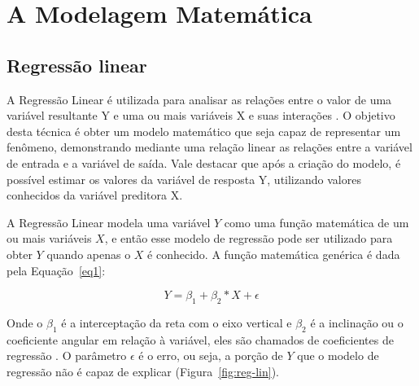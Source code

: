 \chapter{A Modelagem Matemática}
\label{chap:a_modelagem_matematica}


\section{Regressão linear}
\label{sec:a_modelagem_matematica_modelo_linear}

A Regressão Linear é utilizada para analisar as relações entre o valor de uma variável resultante Y e uma ou mais variáveis X e suas interações \cite{yang2020hyperparameter}. O objetivo desta técnica é obter um modelo matemático que seja capaz de representar um fenômeno, demonstrando mediante uma relação linear as relações entre a variável de entrada e a variável de saída. Vale destacar que após a criação do modelo, é possível estimar os valores da variável de resposta Y, utilizando valores conhecidos da variável preditora X.

A Regressão Linear modela uma variável $Y$ como uma função matemática de um ou mais variáveis $X$, e então esse modelo de regressão pode ser utilizado para obter $Y$ quando apenas o $X$ é conhecido. A função matemática genérica é dada pela Equação~\ref{eq1}:

\begin{equation}\label{eq1}
    Y = \beta_1 + \beta_2 * X + \epsilon
\end{equation}


Onde o $\beta_1$ é a interceptação da reta com o eixo vertical e $\beta_2$ é a inclinação ou o coeficiente angular em relação à variável, eles são chamados de coeficientes de regressão \cite{medeiros2009aplicaccao}. O parâmetro $\epsilon$ é o erro, ou seja, a porção de $Y$ que o modelo de regressão não é capaz de explicar (Figura~\ref{fig:reg-lin}).

